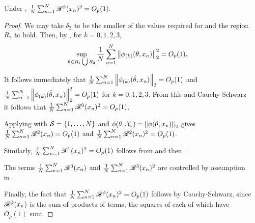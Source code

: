 %
\begin{lem}
%
Under , $\frac{1}{N}\sum_{n=1}^N\mathscr{R}^{\phi}(x_n)^2 = O_p(1)$.
%
\begin{proof}
%


We may take $\delta_2$ to be the smaller of the values required for
  and
the region $R_2$  to
hold.  Then, by  ,
for $k=0,1,2,3$,
%
\begin{align*}
%
\sup_{\theta \in R_1 \bigcup R_2}
    \meann \norm{\phigrad{k}(\theta, \x_n)}_2^2 = O_p(1),
%
\end{align*}
%

It follows immediately that $\frac{1}{N}\sum_{n=1}^N
\left\Vert \phi_{(k)}(\hat\theta, x_n)\right\Vert_2 = O_p(1)$ and $\frac{1}{N}\sum_{n=1}^N
\left\Vert \phi_{(k)}(\hat\theta, x_n)\right\Vert_2^2 = O_p(1)$ for $k=0, 1, 2, 3$. From this
and Cauchy-Schwarz it follows that $\frac{1}{N}\sum_{n=1}^N \mathscr{R}^{0}(x_n)^2 = O_p(1)$.

Applying  with $\mathcal{S} = \{1, \ldots, N \}$ and
$\phi(\theta, {\mathcal{X}}_s) = \left\Vert \phi(\theta, x_n)\right\Vert_2$ gives
$\frac{1}{N}\sum_{n=1}^N \mathscr{R}^{2}(x_n) = O_p(1)$ and $\frac{1}{N}\sum_{n=1}^N \mathscr{R}^{2}(x_n)^2 = O_p(1)$.

Similarly, $\frac{1}{N}\sum_{n=1}^N \mathscr{R}^{1}(x_n)^2 = O_p(1)$ follows from
 and then .

The terms $\frac{1}{N}\sum_{n=1}^N \mathscr{R}^{3}(x_n)$ and $\frac{1}{N}\sum_{n=1}^N \mathscr{R}^{3}(x_n)^2$ are controlled
by assumption in  .

Finally, the fact that $\frac{1}{N}\sum_{n=1}^N \mathscr{R}^{\phi}(x_n)^2 = O_p(1)$ follows
by Cauchy-Schwarz, since $\mathscr{R}^{\phi}(x_n)$ is the sum of products
of terms, the squares of each of which have $O_p(1)$ sum.
%
\end{proof}
%
\end{lem}
%

